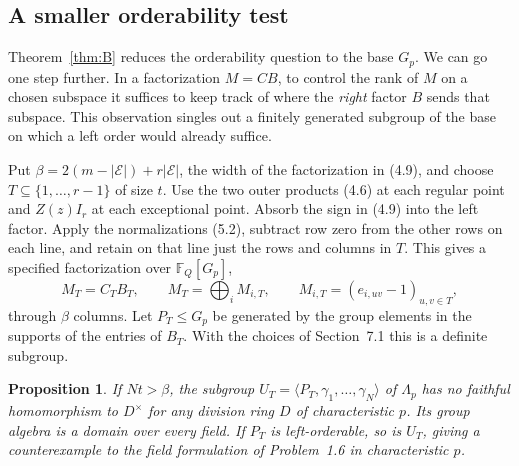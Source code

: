 \documentclass[11pt,a4paper]{article}
\newtheorem{proposition}[theorem]{Proposition}
\numberwithin{equation}{section}
\newcommand{\F}{\mathbb F}
\begin{document}
\subsection{A smaller orderability test}
Theorem~\ref{thm:B} reduces the orderability question to the base \(G_p\). We can go one step further. In a factorization \(M=CB\), to control the rank of \(M\) on a chosen subspace it suffices to keep track of where the \emph{right} factor \(B\) sends that subspace. This observation singles out a finitely generated subgroup of the base on which a left order would already suffice.

Put \(\beta=2(m-|\mathcal E|)+r|\mathcal E|\), the width of the factorization in (4.9), and choose \(T\subseteq\{1,\ldots,r-1\}\) of size \(t\). Use the two outer products (4.6) at each regular point and \(Z(z)I_r\) at each exceptional point. Absorb the sign in (4.9) into the left factor. Apply the normalizations (5.2), subtract row zero from the other rows on each line, and retain on that line just the rows and columns in \(T\). This gives a specified factorization over \(\F_Q[G_p]\),
\[
 M_T=C_T B_T,\qquad
 M_T=\bigoplus_i M_{i,T},\qquad M_{i,T}=(e_{i,uv}-1)_{u,v\in T},
\]
through \(\beta\) columns. Let \(P_T\le G_p\) be generated by the group elements in the supports of the entries of \(B_T\). With the choices of Section~7.1 this is a definite subgroup.

\begin{proposition}\label{prop:order-test}
If \(Nt>\beta\), the subgroup \(U_T=\langle P_T,\gamma_1,\ldots,\gamma_N\rangle\) of \(\Lambda_p\) has no faithful homomorphism to \(D^\times\) for any division ring \(D\) of characteristic \(p\). Its group algebra is a domain over every field. If \(P_T\) is left-orderable, so is \(U_T\), giving a counterexample to the field formulation of Problem~1.6 in characteristic \(p\).
\end{proposition}
\end{document}
